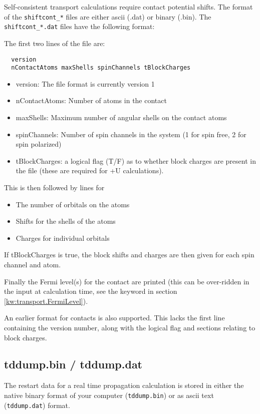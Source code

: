 Self-consistent transport calculations require contact potential shifts. The
format of the \verb|shiftcont_*| files are either ascii (.dat) or binary
(.bin). The \verb|shiftcont_*.dat| files have the following format:

The first two lines of the file are:
\begin{verbatim}
  version
  nContactAtoms maxShells spinChannels tBlockCharges
\end{verbatim}

\begin{itemize}
\item version: The file format is currently version 1
\item nContactAtoms: Number of atoms in the contact
\item maxShells: Maximum number of angular shells on the contact atoms
\item spinChannels: Number of spin channels in the system (1 for spin free, 2
  for spin polarized)
\item tBlockCharges: a logical flag (T/F) as to whether block charges are
  present in the file (these are required for +U calculations).
\end{itemize}
This is then followed by lines for
\begin{itemize}
\item The number of orbitals on the atoms
\item Shifts for the shells of the atoms
\item Charges for individual orbitals
\end{itemize}

If tBlockCharges is true, the block shifts and charges are then given for each
spin channel and atom.

Finally the Fermi level(s) for the contact are printed (this can be over-ridden
in the input at calculation time, see the  keyword in section
\ref{kw:transport.FermiLevel}).

An earlier format for contacts is also supported. This lacks the first line
containing the version number, along with the logical flag and sections
relating to block charges.


\subsection{tddump.bin / tddump.dat}
\label{app:tddump}

The restart data for a real time propagation calculation is stored in either the
native binary format of your computer (\verb|tddump.bin|) or as ascii text
(\verb|tddump.dat|) format.

